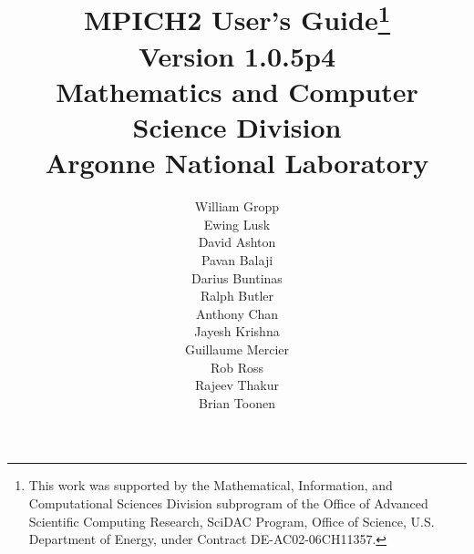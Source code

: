\documentclass[dvipdfm,11pt]{article}
\begin{document}
\title{\textbf{MPICH2 User's Guide}\thanks{This work was supported by the Mathematical,
    Information, and Computational Sciences Division subprogram of the
    Office of Advanced Scientific Computing Research, SciDAC Program,
    Office of Science, U.S. Department of Energy, under Contract
    DE-AC02-06CH11357.}\\
Version 1.0.5p4\\
Mathematics and Computer Science Division\\
Argonne National Laboratory}

\author{William Gropp\\
Ewing Lusk\\
David Ashton\\
Pavan Balaji\\
Darius Buntinas\\
Ralph Butler\\
Anthony Chan\\
Jayesh Krishna\\
Guillaume Mercier\\
Rob Ross\\
Rajeev Thakur\\
Brian Toonen}

\maketitle

\cleardoublepage

\tableofcontents
\clearpage

\pagestyle{headings}


\end{document}
